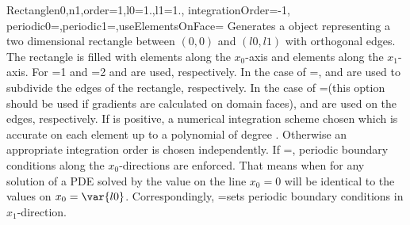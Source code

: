 \begin{funcdesc}{Rectangle}{n0,n1,order=1,l0=1.,l1=1., integrationOrder=-1, \\
  periodic0=\False,periodic1=\False,useElementsOnFace=\False}
Generates a \Domain object representing a two dimensional rectangle between
$(0,0)$ and $(l0,l1)$ with orthogonal edges. The rectangle is filled with
 elements along the $x_0$-axis and
 elements along the $x_1$-axis. 
For =1 and =2
 and  
 are used, respectively. 
In the case of =\False,
 and  
 are used to subdivide the edges of the rectangle, respectively. 
In the case of =\True (this option should be used if gradients
are calculated on domain faces),
 and  
 are used on the edges, respectively.  
If  is positive, a numerical integration scheme
chosen which is accurate on each element up to a polynomial of
degree  . Otherwise
an appropriate integration order is chosen independently. If
=\True, periodic boundary conditions 
along the $x_0$-directions are enforced. That means when for any solution of a PDE solved by \finley
the value on the line $x_0=0$ will be identical to the values on $x_0=\var{l0}$.
Correspondingly,
=\False sets periodic boundary conditions
in $x_1$-direction.
\end{funcdesc}

